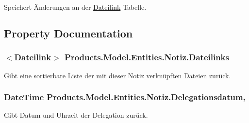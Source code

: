 Speichert Änderungen an der \hyperlink{class_products_1_1_model_1_1_entities_1_1_dateilink}{Dateilink} Tabelle. 



\subsection{Property Documentation}
\subsubsection[{\texorpdfstring{Dateilinks}{Dateilinks}}]{$<${\bf Dateilink}$>$ Products.\+Model.\+Entities.\+Notiz.\+Dateilinks\hspace{0.3cm}{\ttfamily [get]}}\hypertarget{class_products_1_1_model_1_1_entities_1_1_notiz_a8a9cd5a42a8323a307e6586c1731d9c0}{}\label{class_products_1_1_model_1_1_entities_1_1_notiz_a8a9cd5a42a8323a307e6586c1731d9c0}


Gibt eine sortierbare Liste der mit dieser \hyperlink{class_products_1_1_model_1_1_entities_1_1_notiz}{Notiz} verknüpften Dateien zurück. 

\subsubsection[{\texorpdfstring{Delegationsdatum}{Delegationsdatum}}]{\setlength{\rightskip}{0pt plus 5cm}Date\+Time Products.\+Model.\+Entities.\+Notiz.\+Delegationsdatum\hspace{0.3cm}{\ttfamily [get]}, {\ttfamily [set]}}\hypertarget{class_products_1_1_model_1_1_entities_1_1_notiz_aac420f36e934138f3a0e9074ae83c053}{}\label{class_products_1_1_model_1_1_entities_1_1_notiz_aac420f36e934138f3a0e9074ae83c053}


Gibt Datum und Uhrzeit der Delegation zurück. 

